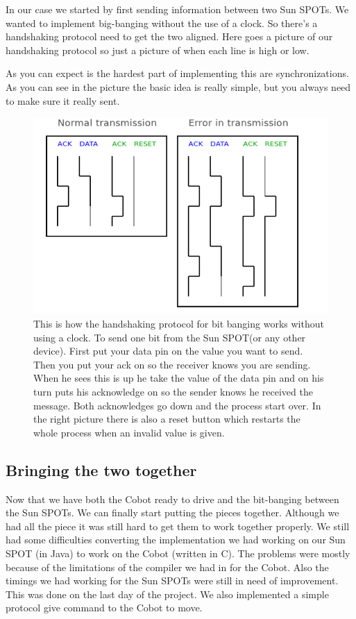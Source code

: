 \documentclass[a4paper,10pt]{article} %
\begin{document}
In our case we started by first sending information between two Sun SPOTs. We
wanted to implement big-banging without the use of a clock. So there's a
handshaking protocol need to get the two aligned. Here goes a picture of our
handshaking protocol so just a picture of when each line is high or low.

As you can expect is the hardest part of implementing this are synchronizations.
As you can see in the picture the basic idea is really simple, but you always
need to make sure it really sent.

\begin{figure}
\label{fig:handshaking}
\includegraphics[scale=0.5]{img/handshaking.png}
\caption{This is how the handshaking protocol for bit banging works without
using a clock. To send one bit from the Sun SPOT(or any other device). First
put your data pin on the value you want to send. Then you put your ack on so
the receiver knows you are sending. When he sees this is up he take the value
of the data pin and on his turn puts his acknowledge on so the sender knows he
received the message. Both acknowledges go down and the process start over. In
the right picture there is also a reset button which restarts the whole process
when an invalid value is given.}
\end{figure}


\subsection{Bringing the two together} %
\label{subsec:together}

Now that we have both the Cobot ready to drive and the bit-banging between the
Sun SPOTs. We can finally start putting the pieces together. Although we had all
the piece it was still hard to get them to work together properly. We still had
some difficulties converting the implementation we had working on our Sun SPOT
(in Java) to work on the Cobot (written in C). The problems were mostly because
of the limitations of the compiler we had in for the Cobot. Also the timings we
had working for the Sun SPOTs were still in need of improvement. This was done on
the last day of the project. We also implemented a simple protocol give command
to the Cobot to move.
\end{document}
